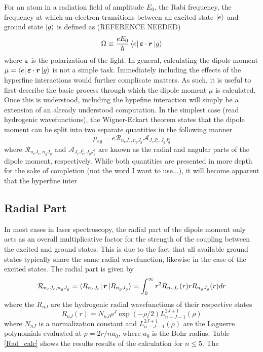 \documentclass[12pt,a4paper,margin=1in]{report}
\begin{document}
For an atom in a radiation field of amplitude $E_0$, the Rabi frequency, the frequency at which an electron transitions between an excited state $\ket{e}$ and ground state $\ket{g}$ is defined as (REFERENCE NEEDED)
\begin{equation}
\Omega \equiv \frac{eE_0}{\hbar}\bra{e}\bm{\varepsilon}\cdot\bm{r}\ket{g}
\end{equation}
where $\bm{\varepsilon}$ is the polarization of the light. In general, calculating the dipole moment  $\mu = \bra{e} \bm{\varepsilon} \cdot \bm{r} \ket{g}$ is not a simple task. Immediately including the effects of the hyperfine interactions would further complicate matters. As such, it is useful to first describe the basic process through which the dipole moment $\mu$ is calculated. Once this is understood, including the hypefine interaction will simply be a extension of an already understood computation.
In the simplest case (read hydrogenic wavefunctions), the Wigner-Eckart theorem states that the dipole moment can be split into two separate quantities in the following manner
\begin{equation}
\mu_{eg} = e \mathcal{R}_{n_e J_e, n_g J_g}\mathcal{A}_{J_eJ_e^z, J_gJ_g^z}
\end{equation}
where $\mathcal{R}_{n_e J_e, n_g J_g}$ and $\mathcal{A}_{J_eJ_e^z, J_gJ_g^z}$ are known as the radial and angular parts of the dipole moment, respectively. While both quantities are presented in more depth for the sake of completion (not the word I want to use...), it will become apparent that the hyperfine inter

\subsection{Radial Part}
In most cases in laser spectroscopy, the radial part of the dipole moment only acts as an overall multiplicative factor for the strength of the coupling between the excited and ground states. This is due to the fact that all available ground states typically share the same radial wavefunction, likewise in the case of the excited states. The radial part is given by
\begin{equation}
\mathcal{R}_{n_e J_e, n_g J_g} = \bra{R_{n_e J_e}}\bm{r}\ket{R_{n_g J_g}} = \int_0^{\infty}r^2R_{n_e J_e}(r)rR_{n_g J_g}(r)dr
\end{equation}
where the $R_{nJ}$ are the hydrogenic radial wavefunctions of their respective states
\begin{equation}
R_{nJ}(r) = N_{nJ}\rho^J\exp(-\rho/2)L_{n-J-1}^{2J+1}(\rho)
\end{equation}
where $N_{nJ}$ is a normalization constant and $L_{n-J-1}^{2J+1}(\rho)$ are the Laguerre polynomials evaluated at $\rho = 2r/na_0$, where $a_0$ is the Bohr radius. Table \ref{Rad_calc} shows the results results of the calculation for $n \leq 5$. The  
\end{document}
